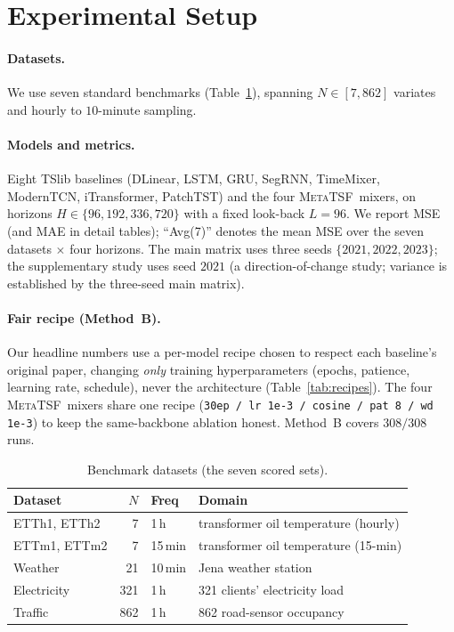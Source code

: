\documentclass[11pt]{article}
\newcommand{\mtsf}{\textsc{MetaTSF}}
\newcommand{\avgseven}{Avg(7)}
\begin{document}
\section{Experimental Setup}
\label{sec:setup}

\paragraph{Datasets.} We use seven standard benchmarks
(Table~\ref{tab:datasets}), spanning $N\!\in\![7,862]$ variates and hourly to
$10$-minute sampling.

\paragraph{Models and metrics.} Eight TSlib baselines (DLinear, LSTM, GRU,
SegRNN, TimeMixer, ModernTCN, iTransformer, PatchTST) and the four \mtsf\ mixers,
on horizons $H\in\{96,192,336,720\}$ with a fixed look-back $L{=}96$. We report
MSE (and MAE in detail tables); ``\avgseven'' denotes the mean MSE over the seven
datasets $\times$ four horizons. The main matrix uses three seeds
$\{2021,2022,2023\}$; the supplementary study uses seed $2021$ (a
direction-of-change study; variance is established by the three-seed main matrix).

\paragraph{Fair recipe (Method~B).} Our headline numbers use a per-model
recipe chosen to respect each baseline's original paper, changing \emph{only}
training hyperparameters (epochs, patience, learning rate, schedule), never the
architecture (Table~\ref{tab:recipes}). The four \mtsf\ mixers share one recipe
(\texttt{30ep / lr 1e-3 / cosine / pat 8 / wd 1e-3}) to keep the same-backbone
ablation honest. Method~B covers $308/308$ runs.

\begin{table}[t]
\centering
\caption{Benchmark datasets (the seven scored sets).}
\label{tab:datasets}
\small
\begin{tabular}{@{}lrll@{}}
\toprule
Dataset & $N$ & Freq & Domain \\
\midrule
ETTh1, ETTh2 & 7   & 1\,h   & transformer oil temperature (hourly) \\
ETTm1, ETTm2 & 7   & 15\,min& transformer oil temperature (15-min) \\
Weather      & 21  & 10\,min& Jena weather station \\
Electricity  & 321 & 1\,h   & 321 clients' electricity load \\
Traffic      & 862 & 1\,h   & 862 road-sensor occupancy \\
\bottomrule
\end{tabular}
\end{table}
\end{document}
